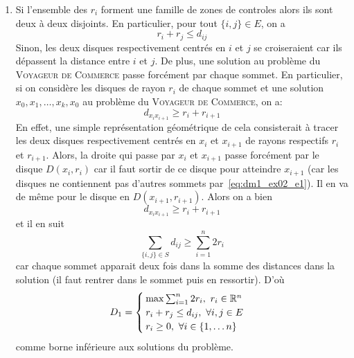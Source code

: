 {\begin{td-sol}[]
\begin{enumerate}
            Cette solution respecte bien toutes les contraintes de \(P_1\) mais correspond à deux cycles disjoints et n'est donc pas solution du \textsc{Voyageur de Commerce}.
            Ainsi une solution de \(P_1\), même si elle est dans \(\{0, 1\}\) ne fournit pas forcément un tour optimal pour le problème du \textsc{Voyageur de Commerce}.

            \item Si l'ensemble des \(r_i\) forment une famille de zones de controles alors ils sont deux à deux disjoints.
            En particulier, pour tout \(\{i,j\}\in E\), on a
            \begin{equation*}\label{eq:dm1_ex02_e1}
                r_i + r_j \leq d_{ij}
            \end{equation*}
            Sinon, les deux disques respectivement centrés en \(i\) et \(j\) se croiseraient car ils dépassent la distance entre \(i\) et \(j\).
            De plus, une solution au problème du \textsc{Voyageur de Commerce} passe forcément par chaque sommet.
            En particulier, si on considère les disques de rayon \(r_i\) de chaque sommet et une solution \(x_0,x_1,\ldots,x_k,x_0\) au problème du \textsc{Voyageur de Commerce}, on a:
            \begin{equation*}
                d_{x_i x_{i+1}} \geq r_i + r_{i+1}
            \end{equation*}
            En effet, une simple représentation géométrique de cela consisterait à tracer les deux disques respectivement centrés en \(x_i\) et \(x_{i+1}\) de rayons respectifs \(r_i\) et \(r_{i+1}\).
            Alors, la droite qui passe par \(x_i\) et \(x_{i+1}\) passe forcément par le disque \(D(x_i, r_i)\) car il faut \og{}sortir de ce disque{} pour atteindre \(x_{i+1}\) (car les disques ne contiennent pas d'autres sommets par~\eqref{eq:dm1_ex02_e1}).
            Il en va de même pour le disque en \(D(x_{i+1}, r_{i+1})\).
            Alors on a bien
            \begin{equation*}
                d_{x_i x_{i+1}} \geq r_i + r_{i+1}
            \end{equation*}
            et il en suit
            \begin{equation*}
                \sum_{\{i, j\}\in S} d_{ij} \geq \sum_{i=1}^n 2 r_i
            \end{equation*}
            car chaque sommet apparait deux fois dans la somme des distances dans la solution (il faut \og{}rentrer\fg{} dans le sommet puis en ressortir). D'où
            \begin{equation*}
                D_1 = 
                \begin{cases}
                    \max \sum_{i=1}^n 2r_i,\ r_i\in\mathbb{R}^n\\
                    r_i + r_j \leq d_{ij},\ \forall {i,j}\in E\\
                    r_i\geq 0,\ \forall i \in \{1,\ldots n\}
                \end{cases}
            \end{equation*}
            comme borne inférieure aux solutions du problème.


\end{enumerate}
\end{td-sol}}
